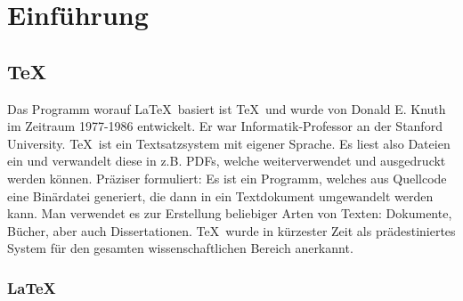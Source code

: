 \section{Einführung} \label{chap:1}
\subsection{\TeX\ } 
Das Programm worauf \LaTeX\ basiert ist \TeX\ und wurde von Donald E. Knuth im Zeitraum 1977-1986 entwickelt. 
Er war Informatik-Professor an der Stanford University. \TeX\ ist ein Textsatzsystem mit eigener Sprache.
Es liest also Dateien ein und verwandelt diese in z.B. PDFs, welche weiterverwendet und ausgedruckt werden können. Präziser formuliert: Es ist ein Programm, welches aus Quellcode eine Binärdatei generiert, die dann in ein Textdokument umgewandelt werden kann. Man verwendet es zur Erstellung beliebiger Arten von Texten: Dokumente, Bücher, aber auch Dissertationen. \TeX\ wurde in kürzester Zeit als prädestiniertes System für den gesamten wissenschaftlichen Bereich anerkannt. \cite[vgl.][S.1]{Oechsner2015}

\subsubsection{\LaTeX\ }
